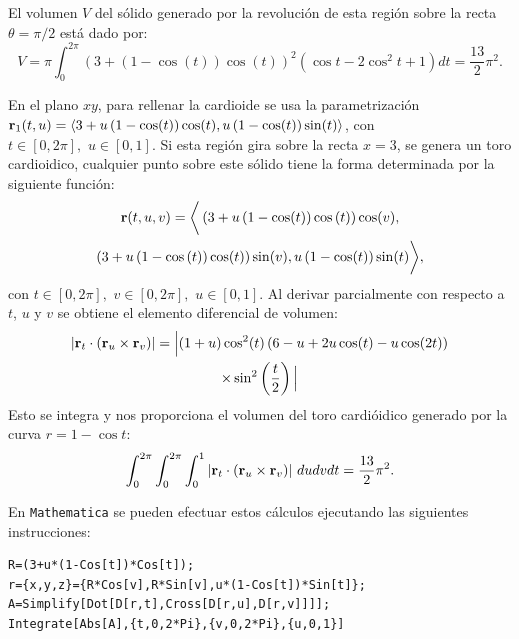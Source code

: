 El volumen $V$ del sólido generado por la revolución de esta región sobre la recta $\theta = \pi/2$ está dado por:
\[V=\pi \int_{0}^{2\pi }\left( 3+\left( 1-\cos (t) \right) \cos (t) \right) ^{2}(\cos t-2\cos ^{2}t+1)dt =
\frac{13}{2}\pi ^{2}.\]

En el plano $xy$, para rellenar la cardioide se usa la parametrización
${\bf r}_1(t,u)=\langle 3+u\left( 1-\cos (t) \right) \cos (t),u\left( 1-\cos (t) \right) \sin (t) \rangle $, con $t\in [0,2\pi ],\,\, u\in [0,1]$.
Si esta región gira sobre la recta $x=3$, se genera un toro cardioidico, cualquier punto sobre este sólido tiene la forma determinada por la si\-guiente función:
\begin{multline*}
{\bf r}(t,u,v)=\bigg \langle \left( 3+u\left( 1-\cos (t) \right) \cos \left(
t\right) \right) \cos (v) , \\
\left( 3+u\left( 1-\cos \left(t\right) \right) \cos (t) \right) \sin (v) , u\left(1-\cos (t) \right) \sin (t) \bigg \rangle,
\end{multline*}
con $t\in [0,2\pi ],\,\,v\in [0,2\pi ],\,\, u\in [0,1]$.
Al derivar parcialmente con respecto a $t$, $u$ y $v$ se obtiene el elemento diferencial de volumen:
\begin{multline*}
\left|{\bf r}_{t}\cdot \left( {\bf r}_{u}\times {\bf r}_{v}\right)\right|
= \Big|(1+u)\cos^2(t)\left(6 - u + 2u\cos(t) - u\cos(2t)\right) \\
\times \sin^2\left( \frac{t}{2} \right)\Big|
\end{multline*}
Esto se integra y nos proporciona el volumen del toro cardióidico generado por la curva $r = 1 - \cos t$:
\[
\int_{0}^{2\pi }\int_{0}^{2\pi }\int_{0}^{1}
\left|{\bf r}_{t}\cdot \left( {\bf r}_{u}\times {\bf r}_{v}\right)\right| \, dudvdt
= \frac{13}{2}\pi ^{2}.
\]

En \verb"Mathematica" se pueden efectuar estos cálculos ejecutando las si\-guientes instrucciones:

\begin{tcolorbox}[title=\bf Instrucción \verb"Mathematica"]\begin{Verbatim}[formatcom=\letraverbatim]
R=(3+u*(1-Cos[t])*Cos[t]);
r={x,y,z}={R*Cos[v],R*Sin[v],u*(1-Cos[t])*Sin[t]};
A=Simplify[Dot[D[r,t],Cross[D[r,u],D[r,v]]]];
Integrate[Abs[A],{t,0,2*Pi},{v,0,2*Pi},{u,0,1}]
\end{Verbatim}
\end{tcolorbox}

